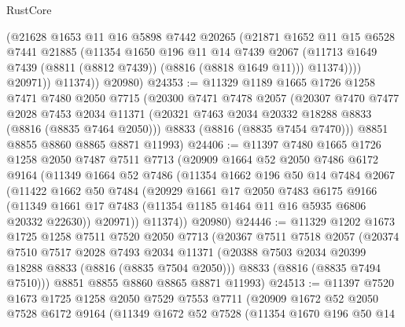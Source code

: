 \begin{lexlean}{RustCore}
\begin{coremodule}
                (@21628
                  @1653
                  @11
                  @16
                  @5898
                  @7442
                  @20265
                  (@21871
                    @1652
                    @11
                    @15
                    @6528
                    @7441
                    @21885
                    (@11354
                      @1650
                      @196
                      @11
                      @14
                      @7439
                      @2067
                      (@11713 @1649 @7439 (@8811 (@8812 @7439)) (@8816 (@8818 @1649 @11)))
                      @11374))))
              @20971))
          @11374))
      @20980)
@24353 := @11329
    @1189
    @1665
    @1726
    @1258
    @7471
    @7480
    @2050
    @7715
    (@20300
      @7471
      @7478
      @2057
      (@20307
        @7470
        @7477
        @2028
        @7453
        @2034
        @11371
        (@20321 @7463 @2034 @20332 @18288 @8833 (@8816 (@8835 @7464 @2050)))
        @8833
        (@8816 (@8835 @7454 @7470)))
      @8851
      @8855
      @8860
      @8865
      @8871
      @11993)
@24406 := @11397
    @7480
    @1665
    @1726
    @1258
    @2050
    @7487
    @7511
    @7713
    (@20909
      @1664
      @52
      @2050
      @7486
      @6172
      @9164
      (@11349
        @1664
        @52
        @7486
        (@11354
          @1662
          @196
          @50
          @14
          @7484
          @2067
          (@11422
            @1662
            @50
            @7484
            (@20929
              @1661
              @17
              @2050
              @7483
              @6175
              @9166
              (@11349 @1661 @17 @7483 (@11354 @1185 @1464 @11 @16 @5935 @6806 @20332 @22630))
              @20971))
          @11374))
      @20980)
@24446 := @11329
    @1202
    @1673
    @1725
    @1258
    @7511
    @7520
    @2050
    @7713
    (@20367
      @7511
      @7518
      @2057
      (@20374
        @7510
        @7517
        @2028
        @7493
        @2034
        @11371
        (@20388 @7503 @2034 @20399 @18288 @8833 (@8816 (@8835 @7504 @2050)))
        @8833
        (@8816 (@8835 @7494 @7510)))
      @8851
      @8855
      @8860
      @8865
      @8871
      @11993)
@24513 := @11397
    @7520
    @1673
    @1725
    @1258
    @2050
    @7529
    @7553
    @7711
    (@20909
      @1672
      @52
      @2050
      @7528
      @6172
      @9164
      (@11349
        @1672
        @52
        @7528
        (@11354
          @1670
          @196
          @50
          @14

\end{coremodule}
\end{lexlean}
